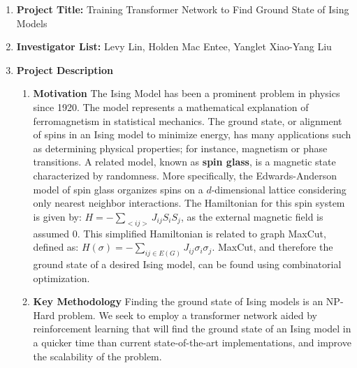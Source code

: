 \documentclass{article}
\begin{document}
\begin{enumerate}
\item \textbf{Project Title:} Training Transformer Network to Find Ground State of Ising Models

\item \textbf{Investigator List:} Levy Lin, Holden Mac Entee, Yanglet Xiao-Yang Liu

\item \textbf{Project Description}
\begin{enumerate}
	\item \textbf{Motivation}
	\newline
	The Ising Model has been a prominent problem in physics since 1920. The model represents a mathematical explanation of ferromagnetism in statistical mechanics. The ground state, or alignment of spins in an Ising model to minimize energy, has many applications such as determining physical properties; for instance, magnetism or phase transitions. A related model, known as \textbf{spin glass}, is a magnetic state characterized by randomness. More specifically, the Edwards-Anderson model of spin glass organizes spins on a $d$-dimensional lattice considering only nearest neighbor interactions. The Hamiltonian for this spin system is given by: $H = - \sum_{<ij>}J_{ij}S_iS_j$, as the external magnetic field is assumed 0. This simplified Hamiltonian is related to graph MaxCut, defined as: $H(\sigma) = - \sum_{ij\in E(G)}J_{ij}\sigma_i\sigma_j$. MaxCut, and therefore the ground state of a desired Ising model, can be found using combinatorial optimization.

	\item \textbf{Key Methodology}
	\newline
		Finding the ground state of Ising models is an NP-Hard problem. We seek to employ a transformer network aided by reinforcement learning that will find the ground state of an Ising model in a quicker time than current state-of-the-art implementations, and improve the scalability of the problem.
	\begin{enumerate}
			

\end{enumerate}
\end{enumerate}
\end{enumerate}
\end{document}

